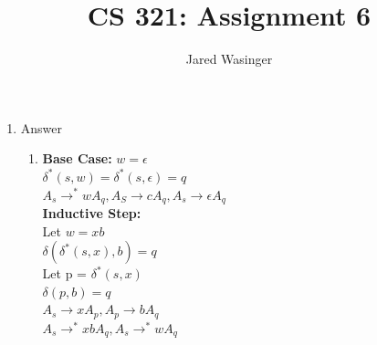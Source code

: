 \documentclass{article}
\begin{document}
  \title{CS 321: Assignment 6}
  \author{Jared Wasinger}

  \maketitle

	\begin{enumerate}
		\item Answer \begin{enumerate}
				\item \textbf{Base Case:} 
					$w = \epsilon$\\
					$\delta^*(s,w) = \delta^*(s, \epsilon) = q$\\
					$ A_s \rightarrow^* wA_q, A_S \rightarrow cA_q, A_s \rightarrow \epsilon A_q$\\

				\textbf{Inductive Step:}\\
					Let $w = xb$\\
					$\delta(\delta^*(s, x), b) = q$\\
					Let p = $\delta^*(s, x)$\\
					$\delta(p, b) = q$\\
					$A_s \rightarrow xA_p, A_p \rightarrow bA_q$\\
					$A_s \rightarrow^* xbA_q, A_s \rightarrow^* wA_q$\\


\end{enumerate}
\end{enumerate}
\end{document}
